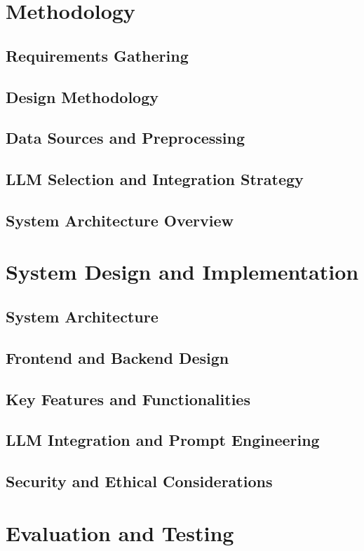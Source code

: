 \documentclass[12pt,a4paper]{report}
\begin{document}
\chapter{Methodology}  %
\section{Requirements Gathering}
\section{Design Methodology}
\section{Data Sources and Preprocessing}
\section{LLM Selection and Integration Strategy}
\section{System Architecture Overview}

\chapter{System Design and Implementation}  %
\section{System Architecture}
\section{Frontend and Backend Design}
\section{Key Features and Functionalities}
\section{LLM Integration and Prompt Engineering}
\section{Security and Ethical Considerations}

\chapter{Evaluation and Testing}  %
\end{document}
